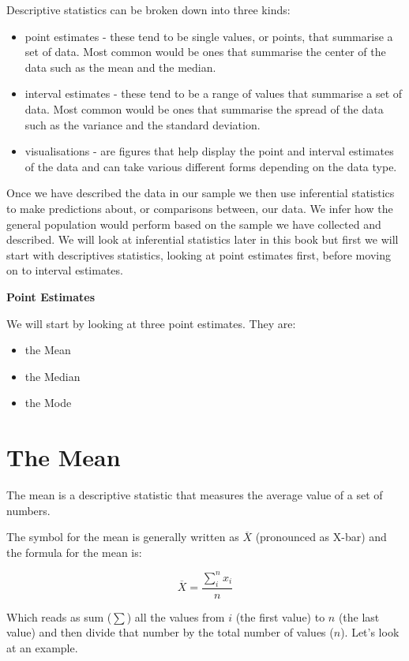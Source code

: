 \documentclass[
  oneside]{book}
\providecommand{\tightlist}{%
  \setlength{\itemsep}{0pt}\setlength{\parskip}{0pt}}
\begin{document}
Descriptive statistics can be broken down into three kinds:

\begin{itemize}
\tightlist
\item
  point estimates - these tend to be single values, or points, that summarise a set of data. Most common would be ones that summarise the center of the data such as the mean and the median.
\item
  interval estimates - these tend to be a range of values that summarise a set of data. Most common would be ones that summarise the spread of the data such as the variance and the standard deviation.
\item
  visualisations - are figures that help display the point and interval estimates of the data and can take various different forms depending on the data type.
\end{itemize}

Once we have described the data in our sample we then use inferential statistics to make predictions about, or comparisons between, our data. We infer how the general population would perform based on the sample we have collected and described. We will look at inferential statistics later in this book but first we will start with descriptives statistics, looking at point estimates first, before moving on to interval estimates.

\textbf{Point Estimates}

We will start by looking at three point estimates. They are:

\begin{itemize}
\tightlist
\item
  the Mean
\item
  the Median
\item
  the Mode
\end{itemize}

\hypertarget{the-mean}{%
\section{The Mean}\label{the-mean}}

The mean is a descriptive statistic that measures the average value of a set of numbers.

The symbol for the mean is generally written as \(\overline{X}\) (pronounced as X-bar) and the formula for the mean is:

\[\overline{X} = \frac{\sum_i^n{x_i}}{n}\]

Which reads as sum (\(\sum\)) all the values from \(i\) (the first value) to \(n\) (the last value) and then divide that number by the total number of values (\(n\)). Let's look at an example.
\end{document}
